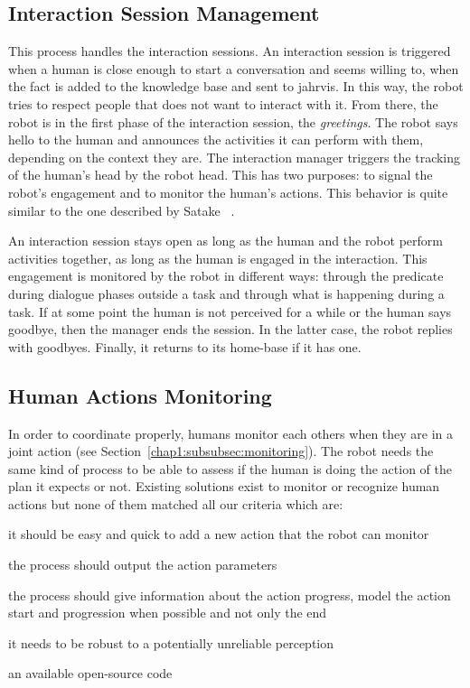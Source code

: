 \documentclass[a4paper,11pt,twoside]{StyleThese}
\begin{document}
\subsection{Interaction Session Management} 
This process handles the interaction sessions. An interaction session is triggered when a human is close enough to start a conversation and seems willing to, \ie when the fact   is added to the knowledge base and sent to \acrshort{jahrvis}. In this way, the robot tries to respect people that does not want to interact with it. From there, the robot is in the first phase of the interaction session, the \textit{greetings}. The robot says hello to the human and announces the activities it can perform with them, depending on the context they are. The interaction manager triggers the tracking of the human's head by the robot head. This has two purposes: to signal the robot's engagement and to monitor the human's actions. This behavior is quite similar to the one described by Satake \etal~\cite{satake_2015_should}. 

An interaction session stays open as long as the human and the robot perform activities together, \ie as long as the human is engaged in the interaction. This engagement is monitored by the robot in different ways: through the predicate  during dialogue phases outside a task and through what is happening during a task. If at some point the human is not perceived for a while or the human says goodbye, then the manager ends the session. In the latter case, the robot replies with goodbyes. Finally, it returns to its home-base if it has one.

\subsection{Human Actions Monitoring}\label{chap2:subsec:h_moni}
In order to coordinate properly, humans monitor each others when they are in a joint action (see Section~\ref{chap1:subsubsec:monitoring}). The robot needs the same kind of process to be able to assess if the human is doing the action of the plan it expects or not. Existing solutions exist to monitor or recognize human actions but none of them matched all our criteria which are: 
\begin{bulletList}
	\item it should be easy and quick to add a new action that the robot can monitor
	\item the process should output the action parameters
	\item the process should give information about the action progress, \ie model the action start and progression when possible and not only the end
	\item it needs to be robust to a potentially unreliable perception
	\item an available open-source code 
\end{bulletList}
\end{document}
